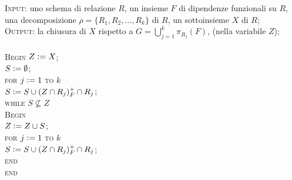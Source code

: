 \begin{alg}
\textsc{Input}: uno schema di relazione $R$, un insieme $F$ di dipendenze funzionali su $R$, una
decomposizione $\rho =\{R_1, R_2, \ldots, R_k\}$ di $R$, un sottoinsieme $X$ di $R$;\\
\textsc{Output}: la chiusura di $X$ rispetto a $G = \bigcup_{j=1}^k \pi_{R_j}(F)$, (nella variabile $Z$);\\\\
\textsc{Begin}
$Z\vcentcolon = X$;\\
$S\vcentcolon = \emptyset$;\\
\textsc{for} $j\vcentcolon = 1$ \textsc{to} $k$\\
\indent$S \vcentcolon= S \cup (Z \cap R_j)^{+}_F \cap R_j$;\\
\textsc{while} $S \not\subseteq Z$\\
\indent \textsc{Begin}\\
\indent $Z\vcentcolon = Z \cup S$;\\
\indent \textsc{for} $j\vcentcolon= 1$ \textsc{to} $k$\\
\indent \indent $S\vcentcolon= S \cup (Z \cap R_j)^{+}_F \cap R_j$;\\
\indent \textsc{end}\\
\textsc{end}\\
\end{alg}

